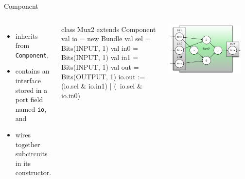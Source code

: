 \documentclass[xcolor=pdflatex,dvipsnames,table]{beamer}
\begin{document}
\begin{frame}[fragile]{Component}

\begin{columns}

\begin{itemize}
\item inherits from \verb+Component+,
\item contains an interface stored in a port field named \verb+io+, and
\item wires together subcircuits in its constructor.
\end{itemize}

\begin{scala}
class Mux2 extends Component {
  val io = new Bundle{
    val sel = Bits(INPUT, 1)
    val in0 = Bits(INPUT, 1)
    val in1 = Bits(INPUT, 1)
    val out = Bits(OUTPUT, 1)
  }
  io.out := (io.sel & io.in1) | 
            (~io.sel & io.in0)
}
\end{scala}


\begin{center}
\includegraphics[width=0.9\textwidth]{figs/mux2-component.pdf} 
\end{center}

\end{columns}

\end{frame}
\end{document}
